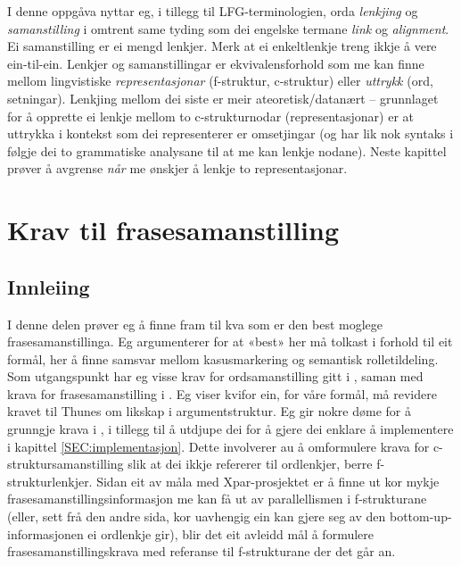 \documentclass[11pt,a4paper,oneside,draft]{report}
\begin{document}
 I denne oppgåva nyttar eg, i tillegg til LFG-terminologien, orda
 \emph{lenkjing} og \emph{samanstilling} i omtrent same tyding som dei engelske
 termane \emph{link} og \emph{alignment}. Ei samanstilling er ei mengd
 lenkjer. Merk at ei enkeltlenkje treng ikkje å vere ein-til-ein.
 Lenkjer og samanstillingar er ekvivalensforhold som me kan finne
 mellom lingvistiske \emph{representasjonar} (f-struktur, c-struktur) eller
 \emph{uttrykk} (ord, setningar). Lenkjing mellom dei siste er meir
 ateoretisk/datanært -- grunnlaget for å opprette ei lenkje mellom to
 c-strukturnodar (representasjonar) er at uttrykka i kontekst som dei
 representerer er omsetjingar (og har lik nok syntaks i følgje dei to
 grammatiske analysane til at me kan lenkje nodane). Neste kapittel
 prøver å avgrense \emph{når} me ønskjer å lenkje to representasjonar.


\chapter{Krav til frasesamanstilling}
\label{sec-3}

\label{SEC:ideell}

\section{Innleiing}
\label{sec-3.1}

I denne delen prøver eg å finne fram til kva som er den best moglege
frasesamanstillinga. Eg argumenterer for at «best» her må tolkast i
forhold til eit formål, her å finne samsvar mellom kasusmarkering og
semantisk rolletildeling. Som utgangspunkt har eg visse krav for
ordsamanstilling gitt i \citet{thunes2003eal}, saman med krava for
frasesamanstilling i \citet{dyvik2009lmp}. Eg viser kvifor ein, for
våre formål, må revidere kravet til Thunes om likskap i
argumentstruktur. Eg gir nokre døme for å grunngje krava i
\citet{dyvik2009lmp}, i tillegg til å utdjupe dei for å gjere dei
enklare å implementere i kapittel \ref{SEC:implementasjon}. Dette
involverer au å omformulere krava for c-struktursamanstilling slik at
dei ikkje refererer til ordlenkjer, berre f-strukturlenkjer. Sidan eit
av måla med Xpar-prosjektet er å finne ut kor mykje
frasesamanstillingsinformasjon me kan få ut av parallellismen i
f-strukturane (eller, sett frå den andre sida, kor uavhengig ein kan
gjere seg av den bottom-up-informasjonen ei ordlenkje gir), blir det
eit avleidd mål å formulere frasesamanstillingskrava med referanse til
f-strukturane der det går an.
\end{document}

